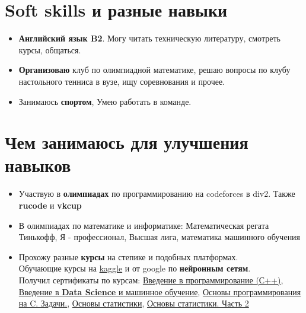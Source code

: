 \documentclass[a4paper,12pt]{article}
\begin{document}
\section{Soft skills и разные навыки}
\begin{itemize}
    \item \textbf{Английский язык B2}. Могу читать техническую литературу, смотреть курсы, общаться.
    \item \textbf{Организоваю} клуб по олимпиадной математике, решаю вопросы по клубу настольного тенниса в вузе, ищу соревнования и прочее.
    \item Занимаюсь \textbf{спортом}, Умею работать в команде.
\end{itemize}

\section{Чем занимаюсь для улучшения навыков}
\begin{itemize}
    \item Участвую в \textbf{олимпиадах} по программированию на codeforces в div2. Также \textbf{rucode} и \textbf{vkcup}
    \item В олимпиадах по математике и информатике: Математическая регата Тинькофф, Я - профессионал, Высшая лига, математика машинного обучения

    \item Прохожу разные \textbf{курсы} на степике и подобных платформах.
    \\ Обучающие курсы на \underline{kaggle} и от google по \textbf{нейронным сетям}.
    \\Получил сертификаты по курсам:        \href{https://stepik.org/course/363/syllabus}{Введение в программирование (С++)}, \href{https://stepik.org/course/4852/syllabus}{Введение в \textbf{Data Science} и машинное обучение},          \href{https://stepik.org/course/3078/syllabus}{Основы программирования на C. Задачи.}, \href{https://stepik.org/course/76/syllabus}{Основы статистики}, \href{https://stepik.org/course/524/syllabus}{Основы статистики. Часть 2}    
\end{itemize}
\end{document}
